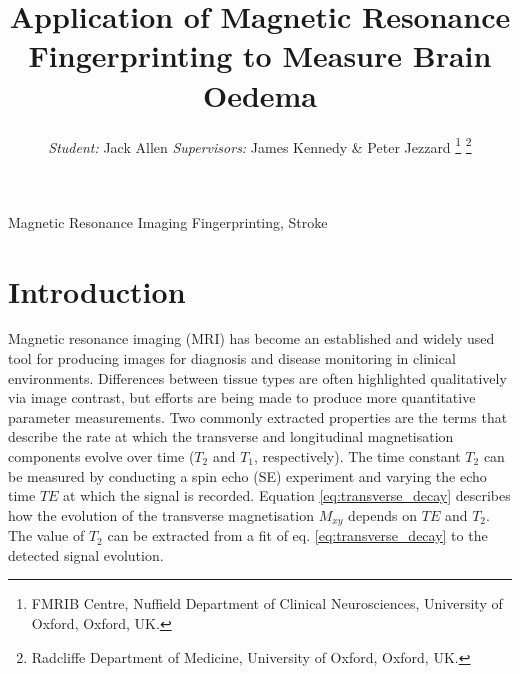 \documentclass[journal]{IEEEtran}
\begin{document}







\title{ Application of Magnetic Resonance Fingerprinting to Measure Brain Oedema} 


\author{\textit{Student:} Jack Allen \textit{Supervisors:} James Kennedy \& Peter Jezzard \thanks{FMRIB Centre, Nuffield Department of Clinical Neurosciences, University of Oxford, Oxford, UK.} \thanks{Radcliffe Department of Medicine, University of Oxford, Oxford, UK.}}


\maketitle


\begin{abstract}

\end{abstract}


\begin{IEEEkeywords}
Magnetic Resonance Imaging Fingerprinting, Stroke
\end{IEEEkeywords}




\section{Introduction}

Magnetic resonance imaging (MRI) has become an established and widely used tool for producing images for diagnosis and disease monitoring in clinical environments. Differences between tissue types are often highlighted qualitatively via image contrast, but efforts are being made to produce more quantitative parameter measurements. Two commonly extracted properties are the terms that describe the rate at which the transverse and longitudinal magnetisation components evolve over time ($T_2$ and $T_1$, respectively). The time constant $T_2$ can be measured by conducting a spin echo (SE) experiment and varying the echo time $TE$ at which the signal is recorded. Equation \ref{eq:transverse_decay} describes how the evolution of the transverse magnetisation $M_{xy}$ depends on $TE$ and $T_2$. The value of $T_2$ can be extracted from a fit of eq. \ref{eq:transverse_decay} to the detected signal evolution.
\end{document}
